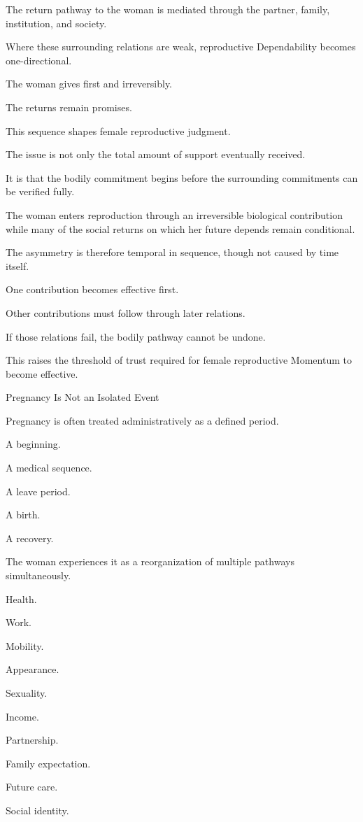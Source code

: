 The return pathway to the woman is mediated through the partner, family, institution, and society.

Where these surrounding relations are weak, reproductive Dependability becomes one-directional.

The woman gives first and irreversibly.

The returns remain promises.

This sequence shapes female reproductive judgment.

The issue is not only the total amount of support eventually received.

It is that the bodily commitment begins before the surrounding commitments can be verified fully.

The woman enters reproduction through an irreversible biological contribution while many of the social returns on which her future depends remain conditional.

The asymmetry is therefore temporal in sequence, though not caused by time itself.

One contribution becomes effective first.

Other contributions must follow through later relations.

If those relations fail, the bodily pathway cannot be undone.

This raises the threshold of trust required for female reproductive Momentum to become effective.

Pregnancy Is Not an Isolated Event

Pregnancy is often treated administratively as a defined period.

A beginning.

A medical sequence.

A leave period.

A birth.

A recovery.

The woman experiences it as a reorganization of multiple pathways simultaneously.

Health.

Work.

Mobility.

Appearance.

Sexuality.

Income.

Partnership.

Family expectation.

Future care.

Social identity.


